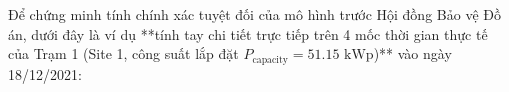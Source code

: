 \documentclass[12pt,a4paper]{article}
\begin{document}
Để chứng minh tính chính xác tuyệt đối của mô hình trước Hội đồng Bảo vệ Đồ án, dưới đây là ví dụ **tính tay chi tiết trực tiếp trên 4 mốc thời gian thực tế của Trạm 1 (Site 1, công suất lắp đặt $P_{\text{capacity}} = 51.15 \text{ kWp}$)** vào ngày 18/12/2021:

\begin{table}[H]
\centering
\caption{Dữ liệu thực tế và kết quả dự báo tại Trạm 1 (Site 1) khung giờ 11:00 -- 11:45}
\label{tab:worked_example_data}
\end{table}
\end{document}
